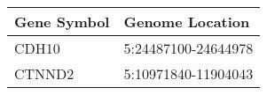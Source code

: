 \begin{tabular}{ll}
\toprule
Gene Symbol &     Genome Location \\
\midrule
      CDH10 & 5:24487100-24644978 \\
     CTNND2 & 5:10971840-11904043 \\
\bottomrule
\end{tabular}
